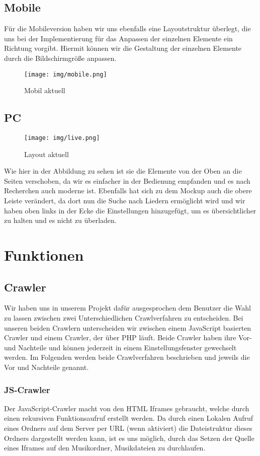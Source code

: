 \documentclass{article}
\begin{document}
\subsection{Mobile}
Für die Mobileversion haben wir uns ebenfalls eine Layoutstruktur überlegt, die uns bei der Implementierung für das Anpassen der einzelnen Elemente ein Richtung vorgibt. Hiermit können wir die Gestaltung der einzelnen Elemente durch die Bildschirmgröße anpassen. 
\begin{figure}[H]
 \centering
 \texttt{[image: img/mobile.png]}
 \caption{Mobil aktuell}
 \label{fig:Mobil}
\end{figure}

\subsection{PC}
\begin{figure}[H]
 \centering
 \texttt{[image: img/live.png]}
 \caption{Layout aktuell}
 \label{fig:layout}
\end{figure}

Wie hier in der Abbildung zu sehen ist sie die Elemente von der Oben an die Seiten verschoben, da wir es einfacher in der Bedienung empfanden und es nach Recherchen auch moderne ist. Ebenfalls hat sich zu dem Mockup auch die obere Leiste verändert, da dort nun die Suche nach Liedern ermöglicht wird und wir haben oben links in der Ecke die Einstellungen hinzugefügt, um es übersichtlicher zu halten und es nicht zu überladen.
\section{Funktionen}

\subsection{Crawler}
Wir haben uns in unserem Projekt dafür ausgesprochen dem Benutzer die Wahl zu lassen zwischen zwei Unterschiedlichen Crawlverfahren zu entscheiden. Bei unseren beiden Crawlern unterscheiden wir zwischen einem JavaScript basierten Crawler und einem Crawler, der über PHP läuft. 
Beide Crawler haben ihre Vor- und Nachteile und können jederzeit in einem Einstellungsfenster gewechselt werden.
Im Folgenden werden beide Crawlverfahren beschrieben und jeweils die Vor und Nachteile genannt.
\subsubsection{JS-Crawler}
Der JavaScript-Crawler macht von den HTML Iframes gebraucht, welche durch einen rekursiven Funktionsaufruf erstellt werden. Da durch einen Lokalen Aufruf eines Ordners auf dem Server per URL (wenn aktiviert) die Dateistruktur dieses Ordners dargestellt werden kann, ist es uns möglich, durch das Setzen der Quelle eines Iframes auf den Musikordner, Musikdateien zu durchlaufen. \newline
\end{document}
